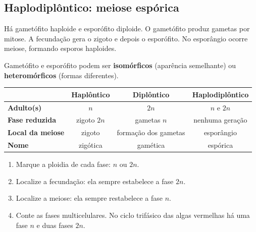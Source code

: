 \documentclass[12pt,a4paper]{article}
\newcommand{\n}{\ensuremath{n}}
\newcommand{\dn}{\ensuremath{2n}}
\begin{document}
\subsection{Haplodiplôntico: meiose espórica}
Há gametófito haploide e esporófito diploide. O gametófito produz gametas por
mitose. A fecundação gera o zigoto e depois o esporófito. No esporângio ocorre
meiose, formando esporos haploides.

\begin{center}
\end{center}

Gametófito e esporófito podem ser \textbf{isomórficos} (aparência semelhante)
ou \textbf{heteromórficos} (formas diferentes).

\begin{resumo}
\begin{center}
\begin{tabularx}{0.96\textwidth}{>{\bfseries}lCCC}
\toprule
& Haplôntico & Diplôntico & Haplodiplôntico\\
\midrule
Adulto(s) & \n & \dn & \n{} e \dn\\
Fase reduzida & zigoto \dn & gametas \n & nenhuma geração\\
Local da meiose & zigoto & formação dos gametas & esporângio\\
Nome & zigótica & gamética & espórica\\
\bottomrule
\end{tabularx}
\end{center}
\end{resumo}

\begin{essencial}[title={Como reconhecer o ciclo em uma questão}]
\begin{enumerate}
\item Marque a ploidia de cada fase: \n{} ou \dn{}.
\item Localize a fecundação: ela sempre estabelece a fase \dn{}.
\item Localize a meiose: ela sempre restabelece a fase \n{}.
\item Conte as fases multicelulares. No ciclo trifásico das algas vermelhas
há uma fase \n{} e duas fases \dn{}.
\end{enumerate}
\end{essencial}
\end{document}
